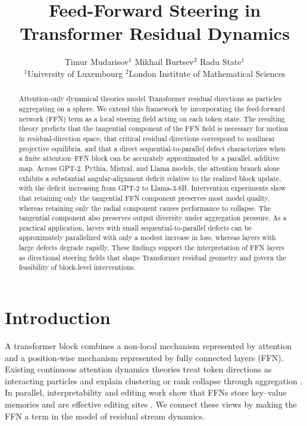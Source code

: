 \documentclass[11pt]{article}
\title{Feed-Forward Steering in Transformer Residual Dynamics}
\author{%
Timur Mudarisov$^{1}$ \quad Mikhail Burtsev$^{2}$ \quad Radu State$^{1}$\\[0.6em]
\small $^{1}$University of Luxembourg \qquad
$^{2}$London Institute of Mathematical Sciences
}
\date{}
\begin{document}
\maketitle

\begin{abstract}
Attention-only dynamical theories model Transformer residual directions as particles aggregating on a sphere. We extend this framework by incorporating the feed-forward network (FFN) term as a local steering field acting on each token state. The resulting theory predicts that the tangential component of the FFN field is necessary for motion in residual-direction space, that critical residual directions correspond to nonlinear projective equilibria, and that a direct sequential-to-parallel defect characterizes when a finite attention--FFN block can be accurately approximated by a parallel, additive map. Across GPT-2, Pythia, Mistral, and Llama models, the attention branch alone exhibits a substantial angular-alignment deficit relative to the realized block update, with the deficit increasing from GPT-2 to Llama-3-8B. Intervention experiments show that retaining only the tangential FFN component preserves most model quality, whereas retaining only the radial component causes performance to collapse. The tangential component also preserves output diversity under aggregation pressure. As a practical application, layers with small sequential-to-parallel defects can be approximately parallelized with only a modest increase in loss, whereas layers with large defects degrade rapidly. These findings support the interpretation of FFN layers as directional steering fields that shape Transformer residual geometry and govern the feasibility of block-level interventions.
\end{abstract}

\section{Introduction}
A transformer block combines a non-local mechanism represented by attention and a position-wise mechanism represented by fully connected layers (FFN). Existing continuous attention dynamics theories treat token directions as
interacting particles and explain clustering or rank collapse through aggregation
\citep{geshkovski2023mathematical,geshkovski2023emergence,karagodin2024causal}. In
parallel, interpretability and editing work show that FFNs store key--value memories
and are effective editing sites \citep{geva2021transformer,geva2022transformer,meng2022rome,meng2023memit}. We connect these views by making the FFN a term in the model of residual stream dynamics.
\end{document}
